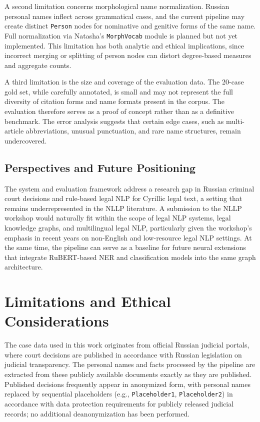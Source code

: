 \documentclass[11pt]{article}
\begin{document}
A second limitation concerns morphological name normalization. Russian personal names inflect across grammatical cases, and the current pipeline may create distinct \texttt{Person} nodes for nominative and genitive forms of the same name. Full normalization via Natasha's \texttt{MorphVocab} module is planned but not yet implemented. This limitation has both analytic and ethical implications, since incorrect merging or splitting of person nodes can distort degree-based measures and aggregate counts.

A third limitation is the size and coverage of the evaluation data. The 20-case gold set, while carefully annotated, is small and may not represent the full diversity of citation forms and name formats present in the corpus. The evaluation therefore serves as a proof of concept rather than as a definitive benchmark. The error analysis suggests that certain edge cases, such as multi-article abbreviations, unusual punctuation, and rare name structures, remain undercovered.

\subsection{Perspectives and Future Positioning}

The system and evaluation framework address a research gap in Russian criminal court decisions and rule-based legal NLP for Cyrillic legal text, a setting that remains underrepresented in the NLLP literature. A submission to the NLLP workshop would naturally fit within the scope of legal NLP systems, legal knowledge graphs, and multilingual legal NLP, particularly given the workshop's emphasis in recent years on non-English and low-resource legal NLP settings. At the same time, the pipeline can serve as a baseline for future neural extensions that integrate RuBERT-based NER and classification models into the same graph architecture.

\section{Limitations and Ethical Considerations}

The case data used in this work originates from official Russian judicial portals, where court decisions are published in accordance with Russian legislation on judicial transparency. The personal names and facts processed by the pipeline are extracted from these publicly available documents exactly as they are published. Published decisions frequently appear in anonymized form, with personal names replaced by sequential placeholders (e.g., \texttt{Placeholder1}, \texttt{Placeholder2}) in accordance with data protection requirements for publicly released judicial records; no additional deanonymization has been performed.
\end{document}
